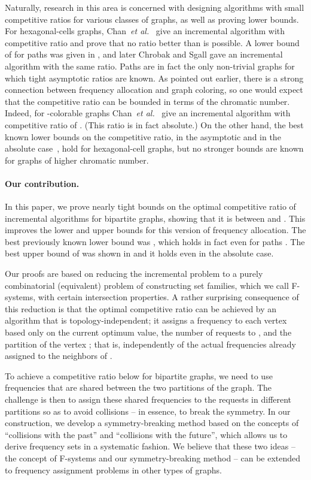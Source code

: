 \documentclass[11pt]{article}
\newcommand{\etal}{{\em et al.}}
\begin{document}
Naturally, research in this area is concerned with designing
algorithms with small competitive ratios for various classes of graphs, 
as well as proving lower bounds. 
For hexagonal-cells graphs, Chan~{\etal}~\cite{ChChYZ07,ChChYZ10} 
give an incremental algorithm with competitive ratio  and
prove that no ratio better than  is possible. A lower bound
of  for paths was given in \cite{ChCYZZ06}, and later
Chrobak and Sgall \cite{ChrSga10} gave an incremental algorithm with
the same ratio. Paths are in fact the only non-trivial graphs for which tight
asymptotic ratios are known. As pointed out earlier, there is a strong
connection between frequency allocation and graph coloring, so one would
expect that the competitive ratio can be bounded in terms of the chromatic
number. Indeed, for -colorable graphs Chan~{\etal}~\cite{ChChYZ07,ChChYZ10}
give an incremental algorithm with competitive ratio of .
(This ratio is in fact absolute.)
On the other hand, the best known lower bounds on the competitive ratio,
 in the asymptotic and  in the absolute case~\cite{ChChYZ07,ChChYZ10},
hold for hexagonal-cell graphs, but no stronger bounds are known for graphs
of higher chromatic number.



\paragraph{Our contribution.}
In this paper, we prove nearly tight bounds on the optimal competitive ratio of
incremental algorithms for bipartite graphs, showing that it is between 
 and .
This improves the lower and upper bounds for this version of frequency allocation.
The best previously known lower bound was , which
holds in fact even for paths \cite{ChCYZZ06,ChrSga10}. The best upper
bound of  was shown in \cite{ChChYZ07,ChChYZ10} and it holds even
in the absolute case. 

Our proofs are based on reducing the incremental problem to a purely 
combinatorial (equivalent) problem of 
constructing set families, which we call F-systems, with certain intersection properties.
A rather surprising consequence of this reduction is
that the optimal competitive ratio can be achieved
by an algorithm that is topology-independent; it assigns
a frequency to each vertex  based only on the current optimum value,
the number of requests to , and the partition of the vertex ;
that is, independently of the actual frequencies already
assigned to the neighbors of .

To achieve a competitive ratio below  for bipartite graphs, we need to use
frequencies that are shared between the two partitions of the graph. The
challenge is then to assign these shared frequencies to the requests in
different partitions so as to avoid collisions -- in essence, to break
the symmetry. In our construction, we develop a symmetry-breaking method
based on the concepts of ``collisions with the past'' and ``collisions with the
future'', which allows us to derive frequency sets in a systematic fashion.
We believe that these two ideas -- the concept of
F-systems and our symmetry-breaking method -- can be extended to frequency
assignment problems in other types of graphs.
\end{document}
